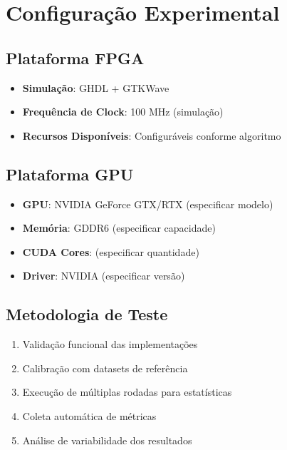 \section{Configuração Experimental}\label{sec:config_experimental}

\subsection{Plataforma FPGA}
\begin{itemize}
    \item \textbf{Simulação}: GHDL + GTKWave
    \item \textbf{Frequência de Clock}: 100 MHz (simulação)
    \item \textbf{Recursos Disponíveis}: Configuráveis conforme algoritmo
\end{itemize}

\subsection{Plataforma GPU}
\begin{itemize}
    \item \textbf{GPU}: NVIDIA GeForce GTX/RTX (especificar modelo)
    \item \textbf{Memória}: GDDR6 (especificar capacidade)
    \item \textbf{CUDA Cores}: (especificar quantidade)
    \item \textbf{Driver}: NVIDIA (especificar versão)
\end{itemize}

\subsection{Metodologia de Teste}
\begin{enumerate}
    \item Validação funcional das implementações
    \item Calibração com datasets de referência
    \item Execução de múltiplas rodadas para estatísticas
    \item Coleta automática de métricas
    \item Análise de variabilidade dos resultados
\end{enumerate}

